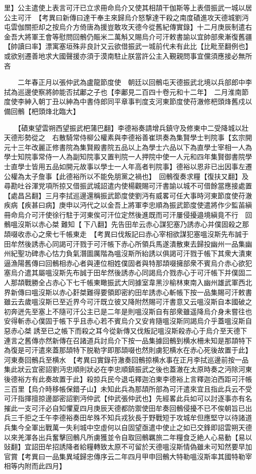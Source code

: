 里】公主遣使上表言可汗已立求冊命烏介又使其相頡干伽斯等上表借振武一城以居公主可汗　【考異曰新傳曰達干奉主來歸烏介怒撃達干殺之南度磧進攻天德城劉沔屯雲伽關拒却之按烏介方倚唐為援豈敢攻天德今從舊紀傳實錄】十二月庚辰制遣右金吾大將軍王會等慰問回鶻仍賑米二萬斛又賜烏介可汗敕書諭以宜帥部衆漸復舊疆【帥讀曰率】漂寓塞垣殊非良計又云欲借振武一城前代未有此比【比毗至翻例也】或欲别遷善地求大國聲援亦須于漠南駐止朕當許公主入覲親問事宜儻須應接必無所吝

　　二年春正月以張仲武為盧龍節度使　朝廷以回鶻屯天德振武北境以兵部郎中李拭為巡邊使察將帥能否拭鄘之子也【李鄘見二百四十卷元和十二年】　二月淮南節度使李紳入朝丁丑以紳為中書侍郎同平章事判度支河東節度使苻澈修杷頭烽舊戍以備回鶻【杷頭烽北臨大】

　　【磧東望雲朔西望振武杷蒲巴翻】李德裕奏請增兵鎮守及修東中二受降城以壯天德形勢從之　右散騎常侍柳公權素與李德裕善崔珙奏為集賢學士判院事【玄宗開元十三年改麗正修書院為集賢殿書院五品以上為學士六品以下為直學士宰相一人為學士知院事常侍一人為副知院事又置判院一人押院中使一人元和四年集賢御書院學士直學士皆用五品如開元故事以學士一人年高者判院事】德裕以恩非已出因事左遷公權為太子詹事【此德裕所以不能免朋黨之禍也】　回鶻復奏求糧【復扶又翻】及尋勘吐谷渾党項所掠又借振武城詔遣内使楊觀賜可汗書諭以城不可借餘當應接處置【處昌呂翻】三月李拭巡邊還稱振武節度使劉沔有威畧可任大事時河東節度使苻澈疾病【疾甚曰病】庚申以沔代之以金吾上將軍李忠順為振武節度使遣將作少監苖縝冊命烏介可汗使徐行駐于河東俟可汗位定然後進既而可汗屢侵擾邉境縝竟不行　回鶻嗢沒斯以赤心桀難知【下八翻】先告田牟云赤心謀犯塞乃誘赤心并僕固殺之那頡啜收赤心之衆七千帳東走　【考異曰伐叛記曰赤心宰相欲謀犯塞嗢沒斯先布誠于田牟然後誘赤心同謁可汗戮于可汗帳下赤心所領兵馬遂潰散東去歸投幽州一品集幽州紀聖功碑赤心怙力負氣潛圖厲階為嗢沒斯所紿誘以俱謁可汗戮于帳下其衆大潰東逼漁陽舊傳曰回鶻相赤心者與連位相姓僕固者與特那頡啜擁部衆不賓烏介赤心欲犯塞烏介遣其屬嗢沒斯先布誠于田牟然後誘赤心同謁烏介戮赤心于可汗帳下并僕固二人那頡戰勝全占赤心下七千帳東瞰振武大同據室韋黑沙榆林東南入幽州雄武軍西北界新傳曰嗢沒斯以赤心姧桀難得要領即密約田牟誘赤心斬帳下按一品集賜可汗敕書雖云去歲嗢沒斯已至近界今可汗既立彼又降附然賜可汗書意又云嗢沒斯自本國破之初奔迸先至塞上不隨可汗公主已是二年是則嗢沒斯自有部衆雖遥降烏介身未嘗往也安得斬赤心僕固于帳下乎且赤心若不賓烏介又安肯隨嗢沒斯同謁烏介乎蓋嗢沒斯自惡赤心桀誘至已之帳下而殺之耳今從新傳又伐叛記嗢沒斯殺赤心于烏介至天德下連言之舊傳亦然新傳在召諸道兵討烏介下按一品集據回鶻到横水柵未知是那頡特下為復是可汗遣來蓋那頡特下脱勒字即那頡啜也然則虜犯横水在赤心死後故置于此】河東奏回鶻兵至横水　【考異曰實錄苻澈奏回鶻掠横水事在正月李拭巡邊前按一品集此狀云宜密詔劉沔忠順則狀必在李忠順鎮振武之後也蓋澈在太原時奏之沔除河東後德裕方有此奏故置于此】殺掠兵民今退屯釋迦泊東李德裕上言釋迦泊西距可汗帳三百里【烏介時移帳保錯子山】未知此兵為那頡所部為可汗遣來宜且指此兵云不受可汗指揮擅掠邊鄙密詔劉沔仲武【仲武張仲武也】先經畧此兵如可以討逐事亦有名摧此一支可汗必自知懼夏四月庚辰天德都防禦使田牟奏回鶻侵擾不已不俟朝旨已出兵三千拒之壬午李德裕奏田牟殊不知兵戎狄長于野戰短于攻城牟但應堅守以待諸道兵集今全軍出戰萬一失利城中空虛何以自固望亟遣中使止之如已交鋒即詔雲朔天德以來羌渾各出兵奮擊回鶻凡所虜獲並令自取回鶻羈旅二年糧食乏絶人心易動【易以䜴翻】宜詔田牟招誘降者給糧轉致太原不可留於天德嗢沒斯情偽雖未可知然要早加官賞【考異曰一品集異域歸忠傳序云二年四月甲申回鶻大特勒嗢沒斯率其國特勒宰相等内附而此四月】

